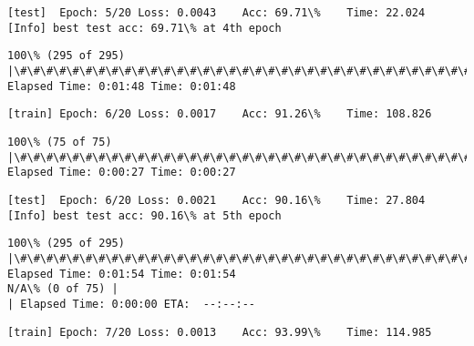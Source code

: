 \documentclass[11pt]{article}
\begin{document}
    \begin{Verbatim}[commandchars=\\\{\}]
[test]	Epoch: 5/20	Loss: 0.0043	Acc: 69.71\%	Time: 22.024
[Info] best test acc: 69.71\% at 4th epoch

    \end{Verbatim}

    \begin{Verbatim}[commandchars=\\\{\}]
100\% (295 of 295) |\#\#\#\#\#\#\#\#\#\#\#\#\#\#\#\#\#\#\#\#\#\#\#\#\#\#\#\#\#\#\#\#\#\#\#\#\#\#\#\#\#\#\#\#\#\#\#\#\#\#\#\#\#\#\#\#\#\#\#\#\#\#\#| Elapsed Time: 0:01:48 Time: 0:01:48

    \end{Verbatim}

    \begin{Verbatim}[commandchars=\\\{\}]
[train]	Epoch: 6/20	Loss: 0.0017	Acc: 91.26\%	Time: 108.826

    \end{Verbatim}

    \begin{Verbatim}[commandchars=\\\{\}]
100\% (75 of 75) |\#\#\#\#\#\#\#\#\#\#\#\#\#\#\#\#\#\#\#\#\#\#\#\#\#\#\#\#\#\#\#\#\#\#\#\#\#\#\#\#\#\#\#\#\#\#\#\#\#\#\#\#\#\#\#\#\#\#\#\#\#\#\#\#\#| Elapsed Time: 0:00:27 Time: 0:00:27

    \end{Verbatim}

    \begin{Verbatim}[commandchars=\\\{\}]
[test]	Epoch: 6/20	Loss: 0.0021	Acc: 90.16\%	Time: 27.804
[Info] best test acc: 90.16\% at 5th epoch

    \end{Verbatim}

    \begin{Verbatim}[commandchars=\\\{\}]
100\% (295 of 295) |\#\#\#\#\#\#\#\#\#\#\#\#\#\#\#\#\#\#\#\#\#\#\#\#\#\#\#\#\#\#\#\#\#\#\#\#\#\#\#\#\#\#\#\#\#\#\#\#\#\#\#\#\#\#\#\#\#\#\#\#\#\#\#| Elapsed Time: 0:01:54 Time: 0:01:54
N/A\% (0 of 75) |                                                                 | Elapsed Time: 0:00:00 ETA:  --:--:--
    \end{Verbatim}

    \begin{Verbatim}[commandchars=\\\{\}]
[train]	Epoch: 7/20	Loss: 0.0013	Acc: 93.99\%	Time: 114.985

    \end{Verbatim}
\end{document}
